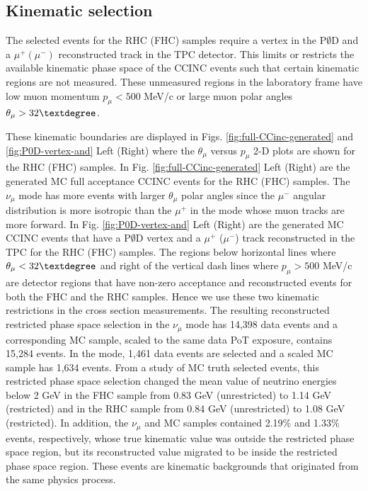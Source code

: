\subsection{Kinematic selection}

The selected events for the RHC (FHC) samples require a vertex in
the P$\emptyset$D and a $\mu^{+}\left(\mu^{-}\right)$ reconstructed track in
the TPC detector. 
This limits or restricts the available kinematic
phase space of the CCINC events such that
certain kinematic regions are not measured. 
These unmeasured regions in the laboratory frame
have low muon momentum 
$p_\mu<500$ MeV/c or large muon polar angles
$\theta_{\mu}>32\textdegree$.

These kinematic boundaries are displayed in Figs. \ref{fig:full-CCinc-generated}
and \ref{fig:P0D-vertex-and} Left (Right)
where the  $\theta_{\mu}$ versus $p_{\mu}$
2-D plots are shown for the RHC (FHC) samples. In Fig.
\ref{fig:full-CCinc-generated} Left (Right) are the generated MC
full acceptance CCINC events for the RHC (FHC) samples. The $\nu_\mu$
mode has more events with larger $\theta_{\mu}$ polar angles since
the $\mu^{-}$ angular distribution is more isotropic than the $\mu^{+}$
in the \nubar mode whose muon tracks are more forward. 
In Fig. \ref{fig:P0D-vertex-and} Left (Right)
are the generated MC CCINC events that have a P$\emptyset$D vertex and a $\mu^+$ ($\mu^-$)
track reconstructed in the TPC for the RHC (FHC) samples. The regions
below horizontal lines  where $\theta_{\mu}<32\textdegree$ and right of
the vertical dash lines where $p_\mu>500$ MeV/c are detector regions
that have non-zero acceptance
and reconstructed events for both the
FHC and the RHC samples.
Hence we use these two kinematic
restrictions in the cross section measurements.
% 
%
The resulting 
reconstructed
restricted phase space selection in
the $\nu_\mu$ mode has 14,398 data events and 
a corresponding MC sample, scaled to the same
data PoT exposure, contains 15,284 events. In the \nubar
mode, 1,461 data events are selected and a scaled MC sample
has 1,634 events. From a study of MC truth selected events, this restricted
phase space selection changed the mean value of 
neutrino energies below 2 GeV in the FHC sample from
0.83 GeV (unrestricted) to 1.14 GeV (restricted) 
and in the RHC sample from 0.84 GeV (unrestricted) to 1.08 GeV (restricted). 
In addition, the $\nu_\mu$ and  \nubar MC samples
contained 2.19\% and 1.33\% events, respectively, 
whose true kinematic value was outside the restricted phase
space region, but its reconstructed value migrated to be 
inside the restricted phase space region.
These events are kinematic backgrounds that originated
from the same physics process. 



